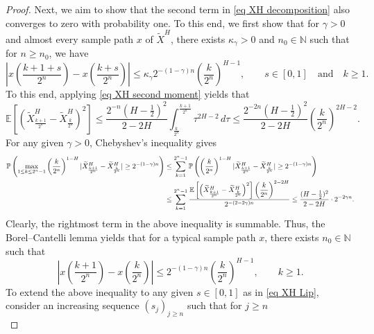 \documentclass[12pt,reqno]{article}
\def\wt{\widetilde}
\newcommand\scalemath[2]{\scalebox{#1}{\mbox{\ensuremath{\displaystyle #2}}}}
\numberwithin{equation}{section}
\theoremstyle{definition}
\def\wt#1{\widetilde{#1}}
\def\wt{\widetilde}
\newcommand{\bE}{\mathbb{E}}
\newcommand{\bN}{\mathbb{N}}
\newcommand{\bP}{\mathbb{P}}
\begin{document}
\begin{proof}
	Next, we aim to show that the second term in \eqref{eq XH decomposition} also converges to zero with probability one. To this end, we first  show that for $\gamma > 0$ and almost every sample path $x$ of $\wt X^H$, there exists $\kappa_{\gamma} > 0$ and $n_0 \in \bN$ such that for $n \ge n_0$, we have 
	\begin{equation}\label{eq XH Lip}
		\left|x\left(\frac{k+1+s}{2^n}\right)-x\left(\frac{k+s}{2^n}\right)\right| \le \kappa_\gamma 2^{-(1-\gamma)n}\left(\frac{k}{2^{n}}\right)^{H-1}, \qquad s \in [0,1] \quad \text{and} \quad k \ge 1.
	\end{equation}
	To this end, applying \eqref{eq XH second moment} yields that 
	\begin{equation*}
		\bE\left[\left(\wt X^H_{\frac{k+1}{2^n}}-\wt X^H_{\frac{k}{2^n}}\right)^2\right] \le \frac{2^{-n}(H-\frac{1}{2})^2}{2-2H}\int_{\frac{k}{2^n}}^{\frac{k+1}{2^n}}\tau^{2H-2}\,d\tau \le \frac{2^{-2n}(H-\frac{1}{2})^2}{2-2H}\left(\frac{k}{2^n}\right)^{2H-2}.
	\end{equation*}
	For any given $\gamma > 0$, Chebyshev's inequality gives 
	\begin{equation*}
		\scalemath{0.9}{\begin{split}
				\bP\left(\max_{1 \le k \le 2^n-1}\left(\frac{k}{2^n}\right)^{1-H}|\wt X^H_{\frac{k+1}{2^n}}-\wt X^H_{\frac{k}{2^n}}| \ge 2^{-(1-\gamma)n}\right) &\le \sum_{k = 1}^{2^n-1}\bP\left(\left(\frac{k}{2^n}\right)^{1-H}|\wt X^H_{\frac{k+1}{2^n}}-\wt X^H_{\frac{k}{2^n}}| \ge 2^{-(1-\gamma)n}\right) \\&\le \sum_{k = 1}^{2^n-1}\frac{\bE\left[\left(\wt X^H_{\frac{k+1}{2^n}}-\wt X^H_{\frac{k}{2^n}}\right)^2\right]\left(\dfrac{k}{2^n}\right)^{2-2H}}{2^{-(2-2\gamma)n}}\le \frac{(H-\frac{1}{2})^2}{2-2H}\cdot 2^{-2\gamma n}.
		\end{split}}
	\end{equation*}
	Clearly, the rightmost term in the above inequality is summable. Thus, the Borel--Cantelli lemma yields that for a typical sample path $x$, there exists $n_0 \in \bN$ such that 
	\begin{equation}\label{eq XH dyadic}
		\left|x\left(\frac{k+1}{2^n}\right)-x\left(\frac{k}{2^n}\right)\right| \le  2^{-(1-\gamma)n}\left(\frac{k}{2^{n}}\right)^{H-1}, \qquad  k \ge 1.
	\end{equation}
	To extend the above inequality to any given $s \in [0,1]$ as in \eqref{eq XH Lip},  consider an increasing sequence $(s_j)_{j \ge n}$ such that for $j \ge n$
	\begin{equation*}

\end{equation*}
\end{proof}
\end{document}
